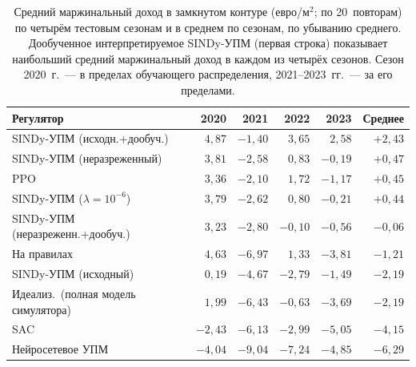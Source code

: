 \documentclass[12pt,a4paper,leqno]{article}
\begin{document}
\begin{table}[t]
\centering
\caption{Средний маржинальный доход в замкнутом контуре (евро/м$^2$; по 20~повторам) по четырём
тестовым сезонам и в среднем по сезонам, по убыванию среднего. Дообученное интерпретируемое
SINDy-УПМ (первая строка) показывает наибольший средний маржинальный доход в каждом из четырёх сезонов. Сезон
2020~г.~--- в пределах обучающего распределения, 2021--2023~гг.~--- за его пределами.}
\label{tab:e3main}
\small
\setlength{\tabcolsep}{6pt}
\begin{tabular}{@{}lrrrrr@{}}
\toprule
Регулятор & 2020 & 2021 & 2022 & 2023 & Среднее \\
\midrule
SINDy-УПМ (исходн.+дообуч.)   & $4{,}87$ & $-1{,}40$ & $3{,}65$ & $2{,}58$ & $+2{,}43$ \\
SINDy-УПМ (неразреженный)          & $3{,}81$ & $-2{,}58$ & $0{,}83$ & $-0{,}19$ & $+0{,}47$ \\
PPO                          & $3{,}36$ & $-2{,}10$ & $1{,}72$ & $-1{,}17$ & $+0{,}45$ \\
SINDy-УПМ ($\lambda=10^{-6}$)           & $3{,}79$ & $-2{,}62$ & $0{,}80$ & $-0{,}21$ & $+0{,}44$ \\
SINDy-УПМ (неразреженн.+дообуч.)   & $3{,}23$ & $-2{,}80$ & $-0{,}10$ & $-0{,}56$ & $-0{,}06$ \\
На правилах                  & $4{,}63$ & $-6{,}97$ & $1{,}33$ & $-3{,}81$ & $-1{,}21$ \\
SINDy-УПМ (исходный)        & $0{,}19$ & $-4{,}67$ & $-2{,}79$ & $-1{,}49$ & $-2{,}19$ \\
Идеализ.\ (полная модель симулятора)  & $1{,}99$ & $-6{,}43$ & $-0{,}63$ & $-3{,}69$ & $-2{,}19$ \\
SAC                          & $-2{,}43$ & $-6{,}13$ & $-2{,}99$ & $-5{,}05$ & $-4{,}15$ \\
Нейросетевое УПМ             & $-4{,}04$ & $-9{,}04$ & $-7{,}24$ & $-4{,}85$ & $-6{,}29$ \\
\bottomrule
\end{tabular}
\end{table}

\end{document}
